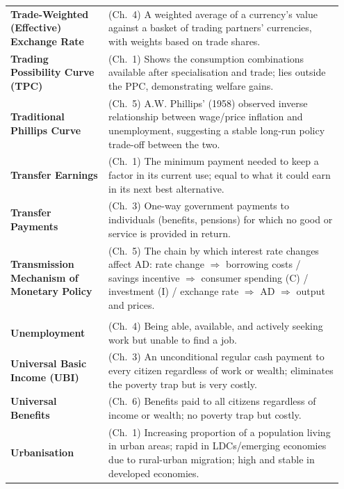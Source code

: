 \documentclass[11pt, a4paper, twoside]{book}
\begin{document}
\begin{longtable}{@{}>{\RaggedRight\arraybackslash}p{0.28\linewidth}>{\RaggedRight\arraybackslash}p{0.67\linewidth}@{}}
\textbf{Trade-Weighted (Effective) Exchange Rate} & (Ch.~4) A weighted average of a currency's value against a basket of trading partners' currencies, with weights based on trade shares. \\
\textbf{Trading Possibility Curve (TPC)} & (Ch.~1) Shows the consumption combinations available after specialisation and trade; lies outside the PPC, demonstrating welfare gains. \\
\textbf{Traditional Phillips Curve} & (Ch.~5) A.W. Phillips' (1958) observed inverse relationship between wage/price inflation and unemployment, suggesting a stable long-run policy trade-off between the two. \\
\textbf{Transfer Earnings} & (Ch.~1) The minimum payment needed to keep a factor in its current use; equal to what it could earn in its next best alternative. \\
\textbf{Transfer Payments} & (Ch.~3) One-way government payments to individuals (benefits, pensions) for which no good or service is provided in return. \\
\textbf{Transmission Mechanism of Monetary Policy} & (Ch.~5) The chain by which interest rate changes affect AD: rate change $\Rightarrow$ borrowing costs / savings incentive $\Rightarrow$ consumer spending (C) / investment (I) / exchange rate $\Rightarrow$ AD $\Rightarrow$ output and prices. \\

\multicolumn{2}{@{}l}{\textbf{\Large\color{CurveNavy} U}} \\[2pt]
\textbf{Unemployment} & (Ch.~4) Being able, available, and actively seeking work but unable to find a job. \\
\textbf{Universal Basic Income (UBI)} & (Ch.~3) An unconditional regular cash payment to every citizen regardless of work or wealth; eliminates the poverty trap but is very costly. \\
\textbf{Universal Benefits} & (Ch.~6) Benefits paid to all citizens regardless of income or wealth; no poverty trap but costly. \\
\textbf{Urbanisation} & (Ch.~1) Increasing proportion of a population living in urban areas; rapid in LDCs/emerging economies due to rural-urban migration; high and stable in developed economies. \\


\end{longtable}
\end{document}
